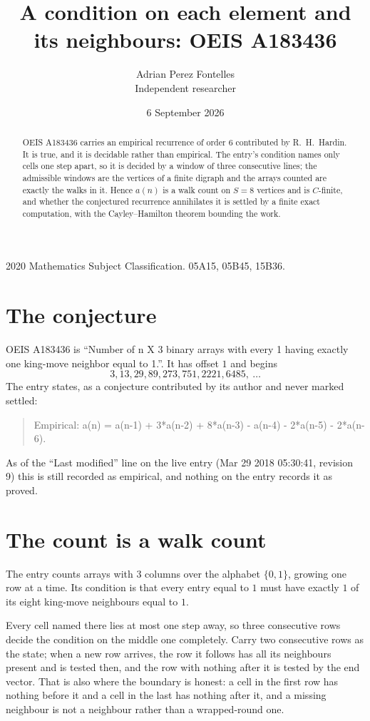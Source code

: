 \documentclass[11pt,a4paper]{article}
\title{A condition on each element and its neighbours: OEIS A183436}
\author{Adrian Perez Fontelles\\ \small Independent researcher}
\date{6 September 2026}
\theoremstyle{plain}
\theoremstyle{definition}
\begin{document}
\maketitle

\begin{abstract}
OEIS A183436 carries an empirical recurrence of order $6$ contributed by R.~H.~Hardin. It is
true, and it is decidable rather than empirical. The entry's condition names only cells one step apart, so it is decided by a window of
three consecutive lines; the
admissible windows are the vertices of a finite digraph and the arrays counted are exactly the
walks in it. Hence $a(n)$ is a walk count on $S=8$ vertices and is $C$-finite, and whether the
conjectured recurrence annihilates it is settled by a finite exact computation, with the
Cayley--Hamilton theorem bounding the work.
\end{abstract}

\noindent\small 2020 Mathematics Subject Classification. 05A15, 05B45, 15B36.\normalsize

\section{The conjecture}

OEIS A183436 is ``Number of n X 3 binary arrays with every 1 having exactly one king-move neighbor equal to 1.''. It has offset $1$ and begins
\[
3, 13, 29, 89, 273, 751, 2221, 6485,\ \dots
\]
The entry states, as a conjecture contributed by its author and never marked settled:
\begin{quote}
Empirical: a(n) = a(n-1) + 3*a(n-2) + 8*a(n-3) - a(n-4) - 2*a(n-5) - 2*a(n-6).
\end{quote}
As of the ``Last modified'' line on the live entry (Mar 29 2018 05:30:41, revision 9) this is still
recorded as empirical, and nothing on the entry records it as proved.

\section{The count is a walk count}

The entry counts arrays with $3$ columns over the alphabet $\{0,1\}$, growing one row at a time. Its condition is that every entry equal to $1$ must have exactly $1$ of its eight king-move neighbours equal to $1$.

Every cell named there lies at most one step away, so three consecutive rows decide the condition on the middle one completely. Carry two consecutive rows as the state; when a new row arrives, the row it follows has all its neighbours present and is tested then, and the row with nothing after it is tested by the end vector. That is also where the boundary is honest: a cell in the first row has nothing before it and a cell in the last has nothing after it, and a missing neighbour is not a neighbour rather than a wrapped-round one.
\end{document}
